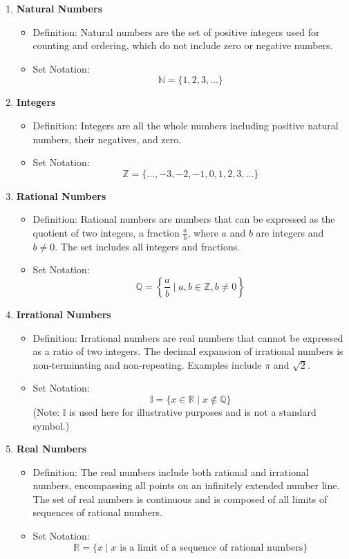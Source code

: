 \documentclass[
	12pt, %
	fleqn, %
	a4paper, %
]{LegrandOrangeBook}
\begin{document}
\begin{enumerate}
  \item \textbf{Natural Numbers}
  \begin{itemize}
    \item Definition: Natural numbers are the set of positive integers used for counting and ordering, which do not include zero or negative numbers.
    \item Set Notation:
    \[
    \mathbb{N} = \{1, 2, 3, \ldots\}
    \]
  \end{itemize}

  \item \textbf{Integers}
  \begin{itemize}
    \item Definition: Integers are all the whole numbers including positive natural numbers, their negatives, and zero.
    \item Set Notation:
    \[
    \mathbb{Z} = \{\ldots, -3, -2, -1, 0, 1, 2, 3, \ldots\}
    \]
  \end{itemize}

  \item \textbf{Rational Numbers}
  \begin{itemize}
    \item Definition: Rational numbers are numbers that can be expressed as the quotient of two integers, a fraction \( \frac{a}{b} \), where \( a \) and \( b \) are integers and \( b \neq 0 \). The set includes all integers and fractions.
    \item Set Notation:
    \[
    \mathbb{Q} = \left\{\frac{a}{b} \mid a, b \in \mathbb{Z}, b \neq 0\right\}
    \]
  \end{itemize}

  \item \textbf{Irrational Numbers}
  \begin{itemize}
    \item Definition: Irrational numbers are real numbers that cannot be expressed as a ratio of two integers. The decimal expansion of irrational numbers is non-terminating and non-repeating. Examples include \(\pi\) and \(\sqrt{2}\).
    \item Set Notation:
    \[
    \mathbb{I} = \{x \in \mathbb{R} \mid x \notin \mathbb{Q}\}
    \]
    (Note: \(\mathbb{I}\) is used here for illustrative purposes and is not a standard symbol.)
  \end{itemize}

  \item \textbf{Real Numbers}
  \begin{itemize}
    \item Definition: The real numbers include both rational and irrational numbers, encompassing all points on an infinitely extended number line. The set of real numbers is continuous and is composed of all limits of sequences of rational numbers.
    \item Set Notation:
    \[
    \mathbb{R} = \{x \mid x \text{ is a limit of a sequence of rational numbers}\}
    \]
  \end{itemize}


\end{enumerate}
\end{document}
